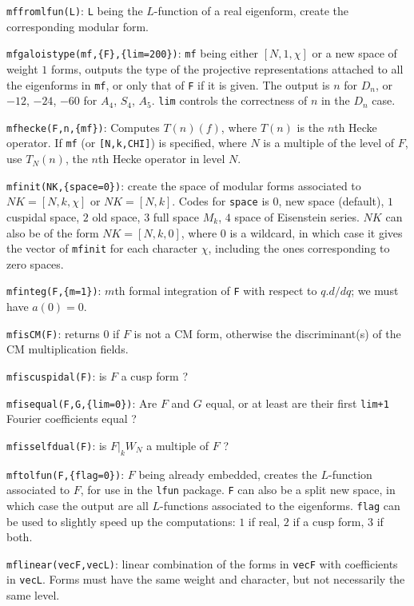 \documentclass[11pt]{article}
\def\kbd#1{{\tt #1}}
\begin{document}
\kbd{mffromlfun(L)}: \kbd{L} being the $L$-function of a real eigenform,
create the corresponding modular form.

\kbd{mfgaloistype(mf,\{F\},\{lim=200\})}: \kbd{mf} being either $[N,1,\chi]$ or
a new space of weight $1$ forms, outputs the type of the projective
representations attached to all the eigenforms in \kbd{mf}, or only that of
\kbd{F} if it is given. The output is $n$ for $D_n$, or $-12$, $-24$, $-60$ for
$A_4$, $S_4$, $A_5$. \kbd{lim} controls the correctness of $n$ in the $D_n$
case.

\kbd{mfhecke(F,n,\{mf\})}: Computes $T(n)(f)$, where $T(n)$ is the $n$th Hecke
operator. If \kbd{mf} (or \kbd{[N,k,CHI]}) is specified, where $N$ is a
multiple of the level of $F$, use $T_N(n)$, the $n$th Hecke operator
in level $N$.

\kbd{mfinit(NK,\{space=0\})}: create the space of modular forms associated to
$NK=[N,k,\chi]$ or $NK=[N,k]$. Codes for \kbd{space} is $0$, new space
(default), $1$ cuspidal space, $2$ old space, $3$ full space $M_k$,
$4$ space of Eisenstein series. $NK$ can also be of the form $NK=[N,k,0]$,
where $0$ is a wildcard, in which case it gives the vector of \kbd{mfinit}
for each character $\chi$, including the ones corresponding to zero spaces.

\kbd{mfinteg(F,\{m=1\})}: $m$th formal integration of \kbd{F} with respect
to $q.d/dq$; we must have $a(0)=0$.

\kbd{mfisCM(F)}: returns $0$ if $F$ is not a CM form, otherwise the
discriminant(s) of the CM multiplication fields.

\kbd{mfiscuspidal(F)}: is $F$ a cusp form ?

\kbd{mfisequal(F,G,\{lim=0\})}: Are $F$ and $G$ equal, or at least are their
first \kbd{lim+1} Fourier coefficients equal ?

\kbd{mfisselfdual(F)}: is $F|_kW_N$ a multiple of $F$ ?

\kbd{mftolfun(F,\{flag=0\})}: $F$ being already embedded, creates the
$L$-function associated to $F$, for use in the \kbd{lfun} package.
\kbd{F} can also be a split new space, in which case the output are
all $L$-functions associated to the eigenforms. \kbd{flag} can be used to
slightly speed up the computations: $1$ if real, $2$ if a cusp form,
$3$ if both.

\kbd{mflinear(vecF,vecL)}: linear combination of the forms in \kbd{vecF}
with coefficients in \kbd{vecL}. Forms must have the same weight and
character, but not necessarily the same level.
\end{document}
